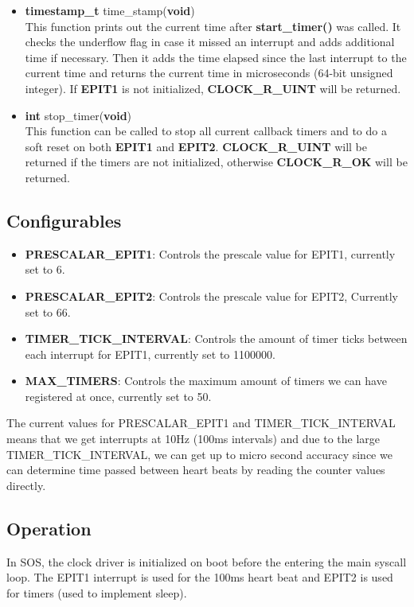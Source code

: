 \documentclass[12pt]{article}
\begin{document}
\begin{itemize}
\item \textbf{timestamp\_t} time\_stamp(\textbf{void})\\
This function prints out the current time after \textbf{start\_timer()} was called. It checks the underflow flag in case it missed an interrupt and adds additional time if necessary. Then it adds the time elapsed since the last interrupt to the current time and returns the current time in microseconds (64-bit unsigned integer). If \textbf{EPIT1} is not initialized, \textbf{CLOCK\_R\_UINT} will be returned.

\item \textbf{int} stop\_timer(\textbf{void})\\
This function can be called to stop all current callback timers and to do a soft reset on both \textbf{EPIT1} and \textbf{EPIT2}. \textbf{CLOCK\_R\_UINT} will be returned if the timers are not initialized, otherwise \textbf{CLOCK\_R\_OK} will be returned.
\end{itemize}

\subsection{Configurables}
\begin{itemize}
\item\textbf{PRESCALAR\_EPIT1}: Controls the prescale value for EPIT1, currently set to 6.
\item\textbf{PRESCALAR\_EPIT2}: Controls the prescale value for EPIT2, Currently set to 66.
\item\textbf{TIMER\_TICK\_INTERVAL}: Controls the amount of timer ticks between each interrupt for EPIT1, currently set to 1100000.
\item\textbf{MAX\_TIMERS}: Controls the maximum amount of timers we can have registered at once, currently set to 50.
\end{itemize}
The current values for PRESCALAR\_EPIT1 and TIMER\_TICK\_INTERVAL means that we get interrupts at 10Hz (100ms intervals) and due to the large TIMER\_TICK\_INTERVAL, we can get up to micro second accuracy since we can determine time passed between heart beats by reading the counter values directly.

\subsection{Operation}
In SOS, the clock driver is initialized on boot before the entering the main syscall loop. The EPIT1 interrupt is used for the 100ms heart beat and EPIT2 is used for timers (used to implement sleep). 
\end{document}
